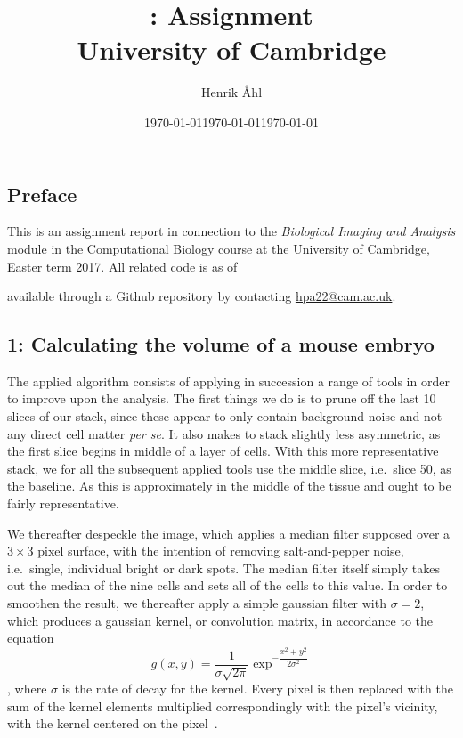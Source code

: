 \documentclass[10pt]{article}
\title{
  \bf \course: Assignment \ass \\[1em]
  \small{University of Cambridge}
}
\author{Henrik Åhl}
\date{\today}
\theoremstyle{plain}
\newcommand{\course}{Biological Imaging and Analysis}
\newcommand{\term}{Easter term 2017}
\begin{document}
\date{\today}
\maketitle
\setcounter{page}{1}
\maketitle

\begin{multicols*}{2}
\section*{Preface}
This is an assignment report in connection to the \textit{\course}
module in the Computational Biology course at the University of Cambridge,
\term. All related code is as of \date{\today} available through a
Github repository by contacting \href{mailto:hpa22@cam.ac.uk}{hpa22@cam.ac.uk}.

\subsection*{1: Calculating the volume of a mouse embryo}
The applied algorithm consists of applying in succession a range of tools in order to improve upon the analysis. The first things we do is to prune off the last 10 slices of our stack, since these appear to only contain background noise and not any direct cell matter \textit{per se}. It also makes to stack slightly less asymmetric, as the first slice begins in middle of a layer of cells. With this more representative stack, we for all the subsequent applied tools use the middle slice, i.e.\ slice 50, as the baseline. As this is approximately in the middle of the tissue and ought to be fairly representative. 

We thereafter despeckle the image, which applies a median filter supposed over a $3\times3$ pixel surface, with the intention of removing salt-and-pepper noise, i.e.\ single, individual bright or dark spots. The median filter itself simply takes out the median of the nine cells and sets all of the cells to this value. In order to smoothen the result, we thereafter apply a simple gaussian filter with $\sigma = 2$, which produces a gaussian kernel, or convolution matrix, in accordance to the equation $$g(x, y) = \dfrac{1}{\sigma \sqrt{2\pi}}\exp^{-\dfrac{x^2 + y^2}{2\sigma^2}}$$, where $\sigma$ is the rate of decay for the kernel. Every pixel is then replaced with the sum of the kernel elements multiplied correspondingly with the pixel's vicinity, with the kernel centered on the pixel~\cite{imagej_methods}. 


\end{multicols*}
\end{document}
